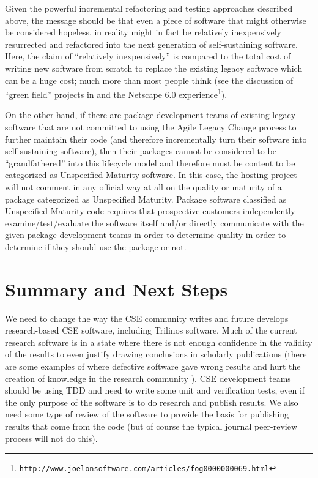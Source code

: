 \documentclass[11pt]{SANDreport}
\begin{document}
Given the powerful incremental refactoring and testing approaches described above, the message should be that even a piece of software that might otherwise be considered hopeless, in reality might in fact be relatively inexpensively resurrected and refactored into the next generation of self-sustaining software.  Here, the claim of ``relatively inexpensively'' is compared to the total cost of writing new software from scratch to replace the existing legacy software which can be a huge cost; much more than most people think (see the discussion of ``green field'' projects in {}\cite{WorkingEffectivelyWithLegacyCode05} and the Netscape 6.0 experience\footnote{\texttt{http://www.joelonsoftware.com/articles/fog0000000069.html}}).

On the other hand, if there are package development teams of existing
legacy software that are not committed to using the Agile Legacy
Change process to further maintain their code (and therefore
incrementally turn their software into self-sustaining software), then
their packages cannot be considered to be ``grandfathered'' into this
lifecycle model and therefore must be content to be categorized as
Unspecified Maturity software.  In this case, the hosting project will
not comment in any official way at all on the quality or maturity of a
package categorized as Unspecified Maturity.  Package software
classified as Unspecified Maturity code requires that prospective
customers independently examine/test/evaluate the software itself
and/or directly communicate with the given package development teams
in order to determine quality in order to determine if they should use
the package or not.


%
{}\section{Summary and Next Steps}
\label{sec:summary_next_steps}
%

We need to change the way the CSE community writes and future develops
research-based CSE software, including Trilinos software.  Much of the
current research software is in a state where there is not enough
confidence in the validity of the results to even justify drawing
conclusions in scholarly publications (there are some examples of
where defective software gave wrong results and hurt the creation of
knowledge in the research community
{}\cite{ScientistsNightmareFiveRetractions2006}).  CSE development
teams should be using TDD and need to write some unit and verification
tests, even if the only purpose of the software is to do research and
publish results.  We also need some type of review of the software to
provide the basis for publishing results that come from the code (but
of course the typical journal peer-review process will not do this).
\end{document}
